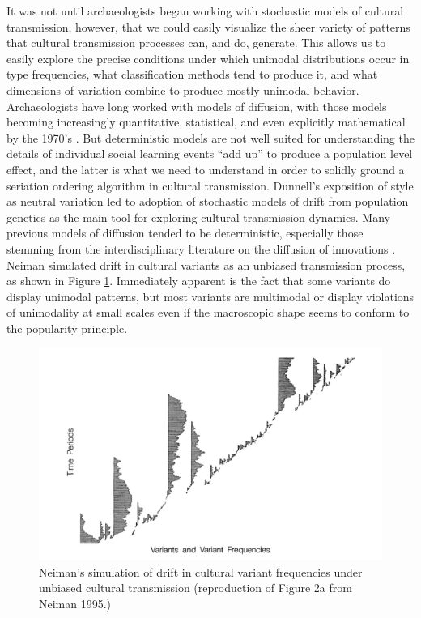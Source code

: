\documentclass[graybox,natbib]{svmult}
\begin{document}
It was not until archaeologists began working with stochastic models of
cultural transmission, however, that we could easily visualize the sheer
variety of patterns that cultural transmission processes can, and do,
generate. This allows us to easily explore the precise conditions under
which unimodal distributions occur in type frequencies, what
classification methods tend to produce it, and what dimensions of
variation combine to produce mostly unimodal behavior. Archaeologists
have long worked with models of diffusion, with those models becoming
increasingly quantitative, statistical, and even explicitly mathematical
by the 1970's \citep[e.g.,][]{ammerman1971measuring}. But deterministic
models are not well suited for understanding the details of individual
social learning events ``add up'' to produce a population level effect,
and the latter is what we need to understand in order to solidly ground
a seriation ordering algorithm in cultural transmission. Dunnell's
\citeyearpar{Dunnell1978} exposition of style as neutral variation led
to adoption of stochastic models of drift from population genetics as
the main tool for exploring cultural transmission dynamics. Many
previous models of diffusion tended to be deterministic, especially
those stemming from the interdisciplinary literature on the diffusion of
innovations \citep[e.g.,][]{Rogers2003}. Neiman \citeyearpar{Neiman1995}
simulated drift in cultural variants as an unbiased transmission
process, as shown in Figure \ref{img:neiman-fig2}. Immediately apparent
is the fact that some variants do display unimodal patterns, but most
variants are multimodal or display violations of unimodality at small
scales even if the macroscopic shape seems to conform to the popularity
principle.

\begin{figure}[ht]
\centering
\includegraphics[scale=0.6]{neiman-1995-figure2a.pdf}
\caption{Neiman's simulation of drift in cultural variant frequencies under unbiased cultural transmission (reproduction of Figure 2a from Neiman 1995.)}
\label{img:neiman-fig2}
\end{figure}
\end{document}
